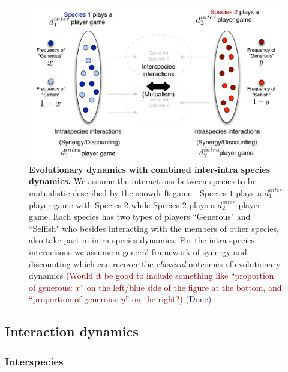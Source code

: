 \documentclass[12pt]{article}
\newcommand{\cha}[1]{\textcolor{darkblue}{(#1)}}
\newcommand{\marcus}[1]{\textcolor{darkred}{(#1)}}
\begin{document}
\begin{figure}
\begin{center}
\includegraphics[scale=0.5]{../Figures/interintra.pdf}
\caption{\small{
\textbf{Evolutionary dynamics with combined inter-intra species dynamics.}
We assume the interactions between species to be mutualistic described by the snowdrift game \citep{bergstrom:PNAS:2003,souza:JTB:2009,gokhale:PRSB:2012}.
Species $1$ plays a $d_1^{inter}$ player game with Species $2$ while Species $2$ plays a $d_2^{inter}$ player game.
Each species has two types of players ``Generous" and ``Selfish" who besides interacting with the members of other species, also take part in intra species dynamics.
For the intra species interactions we assume a general framework of synergy and discounting which can recover the \textit{classical} outcomes of evolutionary dynamics\citep{eshel:AmNat:1988,hauert:JTB:2006a,nowak:book:2006}
}
\marcus{Would it be good to include something like ``proportion of generous: $x$'' on the left/blue side of the figure at the bottom, and ``proportion of generous: $y$'' on the right?}
\cha{Done}
\label{fig:conceptart}
}
\end{center}
\end{figure}


\subsection{Interaction dynamics}
\subsubsection{Interspecies}
\end{document}
